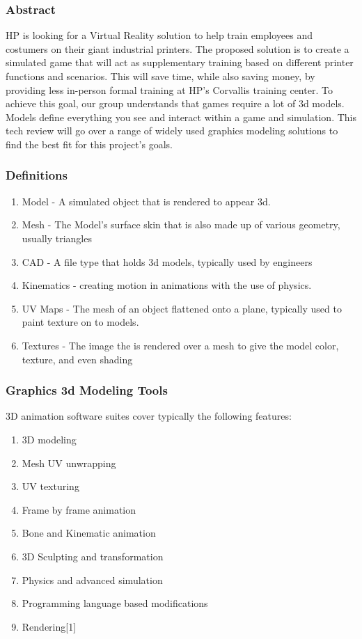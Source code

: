 \documentclass[onecolumn, draftclsnofoot,10pt, compsoc]{IEEEtran}
\begin{document}
\subsubsection*{Abstract}
HP is looking for a Virtual Reality solution to help train employees and costumers on their giant industrial printers. The proposed solution is to create a simulated game that will act as supplementary training based on different printer functions and scenarios. This will save time, while also saving money, by providing less in-person formal training at HP’s Corvallis training center. To achieve this goal, our group understands that games require a lot of 3d models. Models define everything you see and interact within a game and simulation. This tech review will go over a range of widely used graphics modeling solutions to find the best fit for this project’s goals.

\subsubsection{Definitions}
\begin{enumerate}
    \item Model - A simulated object that is rendered to appear 3d.
    \item Mesh - The Model's surface skin that is also made up of various geometry, usually triangles
    \item CAD - A file type that holds 3d models, typically used by engineers
    \item Kinematics - creating motion in animations with the use of physics.
    \item UV Maps - The mesh of an object flattened onto a plane, typically used  to paint texture on to models.
    \item Textures - The image the is rendered over a mesh to give the model color, texture, and even shading
\end{enumerate}

\subsubsection{Graphics 3d Modeling Tools}
3D animation software suites cover typically the following features:

\begin{enumerate}
    \item 3D modeling
    \item Mesh UV unwrapping
    \item UV texturing
    \item Frame by frame animation
    \item Bone and Kinematic animation
    \item 3D Sculpting and transformation
    \item Physics and advanced simulation
    \item Programming language based modifications
    \item Rendering[1]
\end{enumerate}
\end{document}
